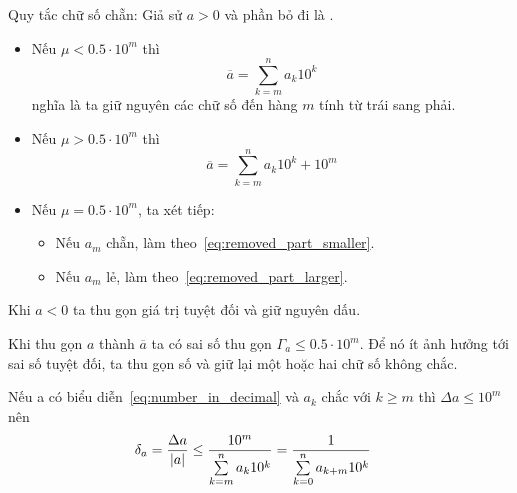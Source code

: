 \documentclass[../../Lectures.tex]{subfiles}
\begin{document}
\begin{rule_of_thumb}
Quy tắc chữ số chẵn: Giả sử \(a > 0\) và phần bỏ đi là \mu.

\begin{itemize}
    \item Nếu \(\mu < \num{0.5} \cdot 10^m\) thì
        \begin{equation}\label{eq:removed_part_smaller}
            \overline{a} = \sum_{k=m}^{n} a_k 10^k
        \end{equation}
        nghĩa là ta giữ nguyên các chữ số đến hàng \(m\) tính từ trái sang phải.
    \item Nếu \(\mu > \num{0.5} \cdot 10^m\) thì
        \begin{equation}\label{eq:removed_part_larger}
            \overline{a} = \sum_{k=m}^{n} a_k 10^k + 10^m
        \end{equation}
    \item Nếu \(\mu = \num{0.5} \cdot 10^m\), ta xét tiếp:
        \begin{itemize}
            \item Nếu \(a_m\) chẵn, làm theo~\ref{eq:removed_part_smaller}.
            \item Nếu \(a_m\) lẻ, làm theo~\ref{eq:removed_part_larger}.
        \end{itemize}
\end{itemize}

Khi \(a < 0\) ta thu gọn giá trị tuyệt đối và giữ nguyên dấu.
\end{rule_of_thumb}

Khi thu gọn \(a\) thành \(\overline{a}\) ta có sai số thu gọn \(\Gamma_a \leq
\num{0.5} \cdot 10^m\). Để nó ít ảnh hưởng tới sai số tuyệt đối, ta thu gọn số
và giữ lại một hoặc hai chữ số không chắc.

Nếu a có biểu diễn~\ref{eq:number_in_decimal} và \(a_k\) chắc với \(k \geq m\)
thì \(\Delta a \leq 10^m\) nên
\[\begin{aligned}
    \delta_a = \frac{\Delta a}{\lvert a\rvert} \leq \frac{10^m}{\sum\limits_{k=m}\limits^{n} a_k 10^k} &= \frac{1}{\sum\limits_{k=0}\limits^{n} a_{k+m} 10^k}
\end{aligned}\]
\end{document}
